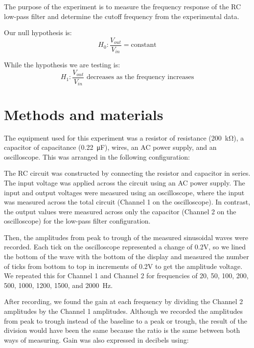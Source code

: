 \documentclass[10pt,journal,twoside]{IEEEtran} %
\begin{document}
The purpose of the experiment is to measure the frequency response of the RC low-pass filter and determine the cutoff frequency from the experimental data.

Our null hypothesis is:
\begin{equation} 
H_0: \frac{V_{out}}{V_{in}} = \text{constant}
\end{equation}

While the hypothesis we are testing is:
\begin{equation}
H_1: \frac{V_{out}}{V_{in}} \text{ decreases as the frequency increases}
\end{equation}


\section{Methods and materials}
The equipment used for this experiment was a resistor of resistance (\SI{200}{\kilo\ohm}), a capacitor of capacitance (\SI{0.22}{\micro\farad}), wires, an AC power supply, and an oscilloscope. This was arranged in the following configuration:

    
    
The RC circuit was constructed by connecting the resistor and capacitor in series. The input voltage was applied across the circuit using an AC power supply. The input and output voltages were measured using an oscilloscope, where the input was measured across the total circuit (Channel 1 on the oscilloscope). In contrast, the output values were measured across only the capacitor (Channel 2 on the oscilloscope) for the low-pass filter configuration.

Then, the amplitudes from peak to trough of the measured sinusoidal waves were recorded. Each tick on the oscilloscope represented a change of 0.2V, so we lined the bottom of the wave with the bottom of the display and measured the number of ticks from bottom to top in increments of 0.2V to get the amplitude voltage. We repeated this for Channel 1 and Channel 2 for frequencies of 20, 50, 100, 200, 500, 1000, 1200, 1500, and \SI{2000}{\hertz}.

After recording, we found the gain at each frequency by dividing the Channel 2 amplitudes by the Channel 1 amplitudes. Although we recorded the amplitudes from peak to trough instead of the baseline to a peak or trough, the result of the division would have been the same because the ratio is the same between both ways of measuring. Gain was also expressed in decibels using:
\end{document}
